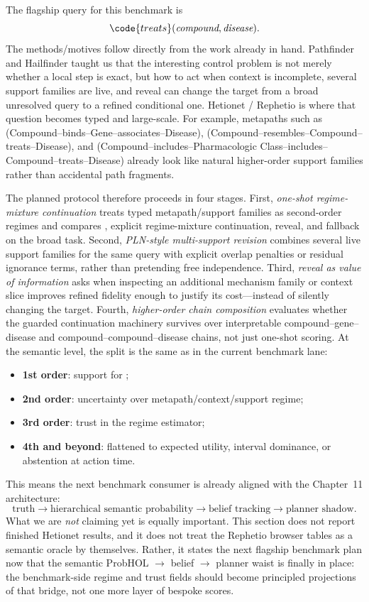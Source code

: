 \documentclass[11pt,openany]{report}
\begin{document}
The flagship query for this benchmark is
\[
  \code{treats}(\textit{compound}, \textit{disease}).
\]
The methods/motives follow directly from the work already in hand.
Pathfinder and Hailfinder taught us that the interesting control problem
is not merely whether a local step is exact, but how to act when context
is incomplete, several support families are live, and reveal can change
the target from a broad unresolved query to a refined conditional one.
Hetionet / Rephetio is where that question becomes typed and large-scale.
For example, metapaths such as
 (Compound--binds--Gene--associates--Disease),
 (Compound--resembles--Compound--treats--Disease), and
 (Compound--includes--Pharmacologic Class--includes--Compound--treats--Disease)
already look like natural higher-order support families rather than
accidental path fragments.
\par
The planned protocol therefore proceeds in four stages.  First,
\emph{one-shot regime-mixture continuation} treats typed
metapath/support families as second-order regimes and compares
, explicit regime-mixture continuation, reveal, and
fallback on the broad  task.  Second,
\emph{PLN-style multi-support revision} combines several live support
families for the same query with explicit overlap penalties or residual
ignorance terms, rather than pretending free independence.  Third,
\emph{reveal as value of information} asks when inspecting an additional
mechanism family or context slice improves refined fidelity enough to
justify its cost---instead of silently changing the target.  Fourth,
\emph{higher-order chain composition} evaluates whether the guarded
continuation machinery survives over interpretable
compound--gene--disease and compound--compound--disease chains, not just
one-shot scoring.
At the semantic level, the split is the same as in the current
benchmark lane:
\begin{itemize}
\item \textbf{1st order}: support for ;
\item \textbf{2nd order}: uncertainty over metapath/context/support
  regime;
\item \textbf{3rd order}: trust in the regime estimator;
\item \textbf{4th and beyond}: flattened to expected utility, interval
  dominance, or abstention at action time.
\end{itemize}
This means the next benchmark consumer is already aligned with the
Chapter~11 architecture:
\[
  \text{truth}
  \to \text{hierarchical semantic probability}
  \to \text{belief tracking}
  \to \text{planner shadow}.
\]
What we are \emph{not} claiming yet is equally important.  This section
does not report finished Hetionet results, and it does not treat the
Rephetio browser tables as a semantic oracle by themselves.  Rather, it
states the next flagship benchmark plan now that the semantic
ProbHOL $\rightarrow$ belief $\rightarrow$ planner waist is finally in
place: the benchmark-side regime and trust fields should become
principled projections of that bridge, not one more layer of bespoke
scores.
\end{document}
